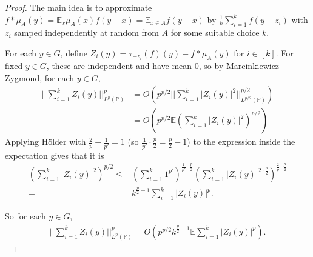 \documentclass{article}
\theoremstyle{definition}
\begin{document}
\begin{proof}
    The main idea is to approximate $f * \mu_A(y) = \mathbb{E}_{x}\mu_A(x)f(y-x) =  \mathbb{E}_{x \in A}f(y-x)$ by $\frac{1}{k}\sum_{i=1}^{k} f(y-z_i)$ with $z_i$ samped independently at random from $A$ for some suitable choice $k$. 
    \vspace{1mm}
     
    For each $y \in G$, define $Z_i(y) = \tau_{-z_i}(f)(y) - f * \mu_A(y)$ for $i \in [k]$. For fixed $y \in G$, these are independent and have mean 0, so by Marcinkiewicz--Zygmond, for each $y \in G$,
    \begin{align*}
        ||\sum_{i=1}^{k} Z_i(y)||_{L^p(\mathbb{P})}^p &= O \left(p^{p/2}||\sum_{i=1}^{k} \left|Z_i(y)\right|^2||_{L^{p/2}(\mathbb{P})}^{p/2} \right) \\
        &= O \left(p^{p/2} \mathbb{E}\left(\sum_{i=1}^{k} \left|Z_i(y)\right|^2 \right)^{p/2} \right)
    \end{align*}
    Applying Hölder with $\frac{2}{p}+\frac{1}{p'}=1$ (so $\frac{1}{p'}\cdot \frac{p}{2} = \frac{p}{2}-1$) to the expression inside the expectation gives that it is 
    \begin{align*}
        \left(\sum_{i=1}^{k} \left|Z_i(y)\right|^2\right)^{p/2} \le& \left(\sum_{i=1}^{k} 1^{p'}\right)^{\frac{1}{p'}\cdot \frac{p}{2}}\left(\sum_{i=1}^{k} \left|Z_i(y)\right|^{2\cdot \frac{p}{2}}\right)^{\frac{2}{p}\cdot \frac{p}{2}}\\
        =& k^{\frac{p}{2}-1}\sum_{i=1}^{k} \left|Z_i(y)\right|^p.
    \end{align*}
    \vspace{1mm}
     
    So for each $y \in G$, 
    \begin{align*}
        ||\sum_{i=1}^{k} Z_i(y)||_{L^p(\mathbb{P})}^p = O \left(p^{p/2} k^{\frac{p}{2}-1} \mathbb{E}\sum_{i=1}^{k} \left|Z_i(y)\right|^p\right).
    \end{align*}
    \vspace{1mm}
     

\end{proof}
\end{document}
